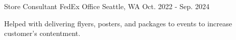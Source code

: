 

\begin{cventries}


  \cventry
    {Store Consultant} %
    {FedEx Office} %
    {Seattle, WA} %
    {Oct. 2022 - Sep. 2024} %
    {
      \begin{cvitems} %
        \item {Helped with delivering flyers, posters, and packages to events to increase customer’s contentment.}
      \end{cvitems}
    }

\end{cventries}
	
